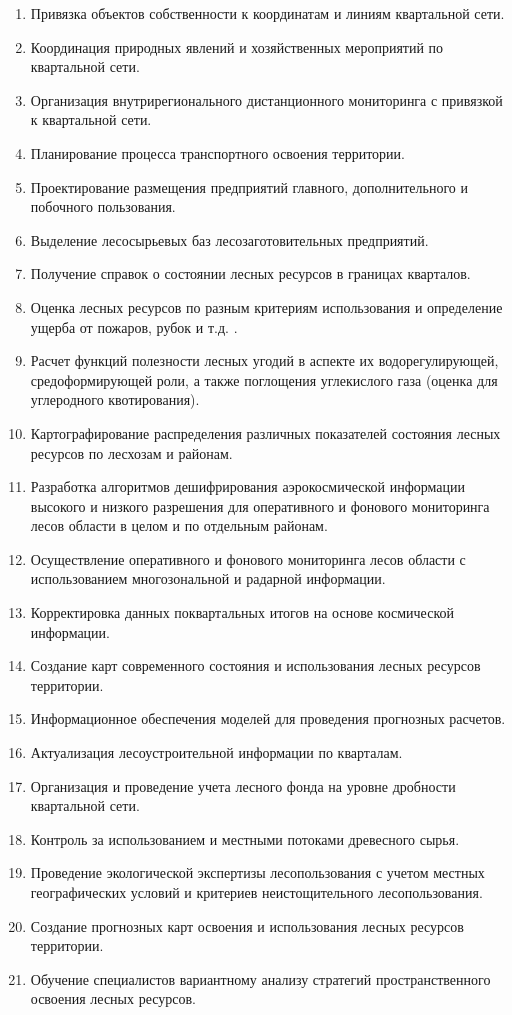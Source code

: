 \documentclass{report}
\begin{document}
\begin{enumerate}
\item Привязка объектов собственности к координатам и линиям квартальной сети. 
\item Координация природных явлений и хозяйственных мероприятий по квартальной сети. 
\item Организация внутрирегионального дистанционного мониторинга с привязкой к квартальной сети.
\item Планирование процесса транспортного освоения территории. 
\item Проектирование размещения предприятий главного, дополнительного и побочного пользования. 
\item Выделение лесосырьевых баз лесозаготовительных предприятий. 
\item Получение справок о состоянии лесных ресурсов в границах кварталов.
\item Оценка лесных ресурсов по разным критериям использования и определение ущерба от пожаров, рубок и т.д. . 
\item Расчет функций полезности лесных угодий в аспекте их водорегулирующей, средоформирующей роли, а также поглощения
углекислого газа (оценка для углеродного квотирования).  
\item Картографирование распределения различных показателей состояния  лесных ресурсов по лесхозам и районам.  
\item Разработка алгоритмов дешифрирования аэрокосмической информации высокого и низкого разрешения для оперативного и
фонового мониторинга лесов области в целом и по отдельным районам. 
\item Осуществление оперативного и фонового мониторинга лесов области с использованием многозональной и радарной
информации. 
\item Корректировка данных поквартальных итогов на основе  космической информации.
\item Создание карт современного состояния и использования лесных ресурсов территории. 
\item Информационное обеспечения моделей для проведения прогнозных расчетов. 
\item Актуализация лесоустроительной информации по кварталам. 
\item Организация и проведение учета лесного фонда на уровне дробности квартальной сети. 
\item Контроль за использованием и местными потоками древесного сырья. 
\item Проведение  экологической экспертизы лесопользования с учетом местных географических условий и критериев
неистощительного лесопользования.  
\item Создание прогнозных карт освоения и использования лесных ресурсов территории. 
\item Обучение специалистов вариантному анализу стратегий пространственного освоения лесных ресурсов. 
\end{enumerate}
\end{document}
